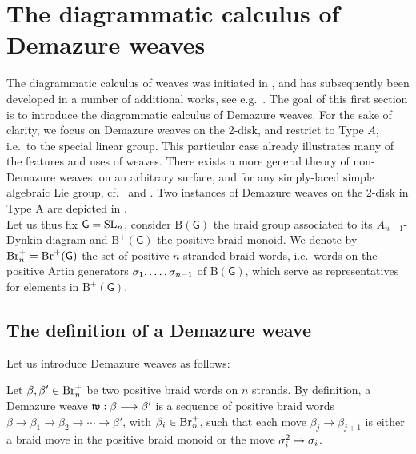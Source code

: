 \section{The diagrammatic calculus of Demazure weaves}\label{sec:diagrammatic_weaves}

The diagrammatic calculus of weaves was initiated in \cite{CasalsZaslow}, and has subsequently been developed in a number of additional works, see e.g.~\cite{CGGJ24,CGGLSS25,CasalsWeng22,casals2023demazureweavesreducedplabic,casals2025comparingclusteralgebrasbraid,casals2025spectralnetworksbettilagrangians}. The goal of this first section is to introduce the diagrammatic calculus of Demazure weaves. For the sake of clarity, we focus on Demazure weaves on the 2-disk, and restrict to Type $A$, i.e.~to the special linear group. This particular case already illustrates many of the features and uses of weaves. There exists a more general theory of non-Demazure weaves, on an arbitrary surface, and for any simply-laced simple algebraic Lie group, cf.~\cite[Section 2]{CasalsZaslow} and \cite[Section 4]{CGGLSS25}. Two instances of Demazure weaves on the 2-disk in Type A are depicted in .\\

Let us thus fix $\mathsf{G}=\operatorname{SL}_n$, consider $\mbox{B}(\mathsf{G})$ the braid group associated to its $A_{n-1}$-Dynkin diagram and $\mbox{B}^+(\mathsf{G})$ the positive braid monoid. We denote by $\text{Br}^+_n=\text{Br}^+(\mathsf{G})$ the set of positive $n$-stranded braid words, i.e.~words on the positive Artin generators $\sigma_1,\ldots,\sigma_{n-1}$ of $\mbox{B}(\mathsf{G})$, which serve as representatives for elements in $\mbox{B}^+(\mathsf{G})$.


\subsection{The definition of a Demazure weave}\label{ssec:primer_Demazure_weaves} Let us introduce Demazure weaves as follows:

\begin{definition}\label{def:Demazure_weave}
Let $\beta,\beta'\in\text{Br}^+_n$ be two positive braid words on $n$ strands. By definition, a Demazure weave $\mathfrak{w}:\beta\longrightarrow\beta'$ is a sequence of positive braid words $\beta\to\beta_1\to\beta_2\to\cdots\to\beta'$, with $\beta_i\in\text{Br}^+_n$, such that each move $\beta_j\to\beta_{j+1}$ is either a braid move in the positive braid monoid or the move $\sigma_i^2\to \sigma_i$.\sbs
\end{definition}

